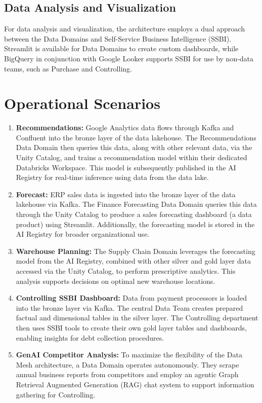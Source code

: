 \subsection{Data Analysis and Visualization}
For data analysis and visualization, the architecture employs a dual approach between the Data Domains and Self-Service Business Intelligence (SSBI). Streamlit is available for Data Domains to create custom dashboards, while BigQuery in conjunction with Google Looker supports SSBI for use by non-data teams, such as Purchase and Controlling.

\section{Operational Scenarios}
\begin{enumerate}
    \item \textbf{Recommendations:} Google Analytics data flows through Kafka and Confluent into the bronze layer of the data lakehouse. The Recommendations Data Domain then queries this data, along with other relevant data, via the Unity Catalog, and trains a recommendation model within their dedicated Databricks Workspace. This model is subsequently published in the AI Registry for real-time inference using data from the data lake.
    \item \textbf{Forecast:} ERP sales data is ingested into the bronze layer of the data lakehouse via Kafka. The Finance Forecasting Data Domain queries this data through the Unity Catalog to produce a sales forecasting dashboard (a data product) using Streamlit. Additionally, the forecasting model is stored in the AI Registry for broader organizational use.
    \item \textbf{Warehouse Planning:} The Supply Chain Domain leverages the forecasting model from the AI Registry, combined with other silver and gold layer data accessed via the Unity Catalog, to perform prescriptive analytics. This analysis supports decisions on optimal new warehouse locations.
    \item \textbf{Controlling SSBI Dashboard:} Data from payment processors is loaded into the bronze layer via Kafka. The central Data Team creates prepared factual and dimensional tables in the silver layer. The Controlling department then uses SSBI tools to create their own gold layer tables and dashboards, enabling insights for debt collection procedures.
    \item \textbf{GenAI Competitor Analysis:} To maximize the flexibility of the Data Mesh architecture, a Data Domain operates autonomously. They scrape annual business reports from competitors and employ an agentic Graph Retrieval Augmented Generation (RAG) chat system to support information gathering for Controlling.
\end{enumerate}


